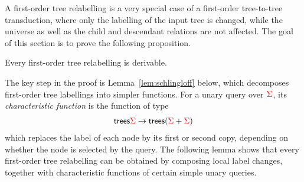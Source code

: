 
A first-order tree relabelling is a very special case of a first-order tree-to-tree transduction, where only the labelling of the input tree is changed, while the universe as well as the child and descendant relations are not affected. 
The goal of this section is to prove the following proposition.
\begin{proposition} \label{prop:forat}    
    Every first-order tree relabelling is derivable.
\end{proposition}   
The key step in the proof is  Lemma~\ref{lem:schlingloff} below, which decomposes  first-order tree labellings into  simpler functions. 
For a unary query  over ${\color{red}{\Sigma}}$,  its \emph{characteristic function} is the function of type
\begin{align*}
 \mathsf {trees} {\color{red}{\Sigma}} \to \mathsf {trees} ({\color{red}{\Sigma}} + {\color{red}{\Sigma}})
\end{align*}
which replaces the label of each node by its first or second copy, depending on whether the node is selected by the query. The following lemma shows that every first-order tree relabelling can be obtained by composing local label changes, together with characteristic functions of certain simple unary queries. 

